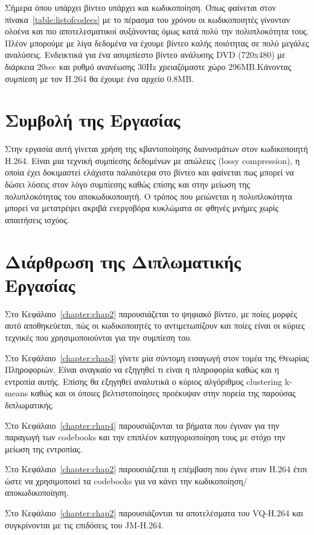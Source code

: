 \indent
Σήμερα όπου υπάρχει βίντεο υπάρχει και κωδικοποίηση. Όπως φαίνεται στον πίνακα~\ref{table:listofcodecs} με το πέρασμα του χρόνου οι κωδικοποιητές γίνονταν ολοένα και πιο αποτελεσματικοί αυξάνοντας όμως κατά πολύ την πολυπλοκότητα τους. Πλέον μπορούμε με λίγα δεδομένα να έχουμε βίντεο καλής ποιότητας σε πολύ μεγάλες αναλύσεις. Ενδεικτικά για ένα ασυμπίεστο βίντεο ανάλυσης DVD (720x480) με διάρκεια 20sec και ρυθμό ανανέωσης \si{30}{Hz} χρειαζόμαστε χώρο 296ΜΒ.Κάνοντας συμπίεση με τον H.264 θα έχουμε ένα αρχείο 0.8ΜΒ.

\section{Συμβολή της Εργασίας}
\label{section:sect12}
\indent
Στην εργασία αυτή γίνεται χρήση της κβαντοποίησης διανυσμάτων στον κωδικοποιητή H.264. Είναι μια τεχνική συμπίεσης δεδομένων με απώλειες (lossy compression), η οποία έχει δοκιμαστεί ελάχιστα παλαιότερα στο βίντεο και φαίνεται πως μπορεί να δώσει λύσεις στον λόγο συμπίεσης καθώς επίσης και στην μείωση της πολυπλοκότητας του αποκωδικοποιητή. Ο τρόπος που μειώνεται η πολυπλοκότητα μπορεί να μετατρέψει ακριβά ενεργοβόρα κυκλώματα σε φθηνές μνήμες χωρίς απαιτήσεις ισχύος.

\section{Διάρθρωση της Διπλωματικής Εργασίας}
\label{section:sect13}

\indent
Στο Κεφάλαιο~\ref{chapter:chap2} παρουσιάζεται το ψηφιακό βίντεο, με ποίες μορφές αυτό αποθηκεύεται, πώς οι κωδικοποιητές το αντιμετωπίζουν και ποίες είναι οι κύριες τεχνικές που χρησιμοποιούνται για την συμπίεση του.\newline \indent

Στο Κεφάλαιο~\ref{chapter:chap3} γίνετε μία σύντομη εισαγωγή στον τομέα της Θεωρίας Πληροφοριών. Είναι αναγκαίο να εξηγηθεί τι είναι η πληροφορία καθώς και η εντροπία αυτής. Επίσης θα εξηγηθεί αναλυτικά ο κύριος αλγόριθμος clustering k-means καθώς και οι όποιες βελτιστοποίησες προέκυψαν στην πορεία της παρούσας διπλωματικής.\newline \indent

Στο Κεφάλαιο~\ref{chapter:chap4} παρουσιάζονται τα βήματα που έγιναν για την παραγωγή των codebooks και την επιπλέον κατηγοριοποίηση τους με στόχο την μείωση της εντροπίας.\newline \indent

Στο Κεφάλαιο~\ref{chapter:chap2} παρουσιάζεται η επέμβαση που έγινε στον H.264 έτσι ώστε να χρησιμοποιεί τα codebooks για να κάνει την κωδικοποίηση/αποκωδικοποίηση.\newline \indent

Στο Κεφάλαιο~\ref{chapter:chap2} παρουσιάζονται τα αποτελέσματα του VQ-H.264 και συγκρίνονται με τις επιδόσεις του JM-H.264. 